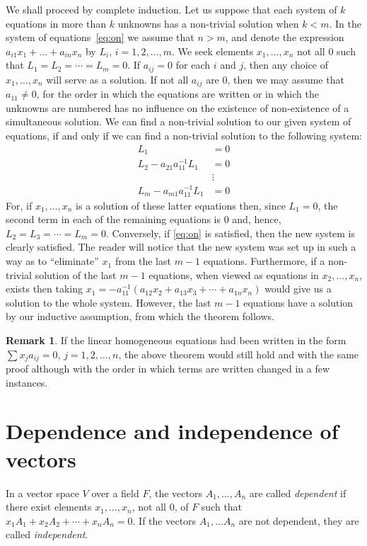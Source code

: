 \documentclass[10pt,leqno,a5paper]{book}
\theoremstyle{definition}
\newtheorem*{rema}{Remark}
\let\htw\section
\begin{document}
We shall proceed by complete induction.
Let us suppose that each system of $k$ equations in more than $k$ unknowns has a non-trivial solution when $k < m$.
In the system of equations~\eqref{eq:on} we assume that $n > m$, and denote the expression $a_{i1} x_1 + \ldots + a_{in} x_n$ by $L_i$, $i = 1,2,\ldots,m$.
We seek elements $x_1, \ldots, x_n$ not all $0$ such that $L_1 = L_2 = \cdots = L_m = 0$.
If $a_{ij} = 0$ for each $i$ and $j$, then any choice of $x_1, \ldots, x_n$ will serve as a solution.
If not all $a_{ij}$ are 0, then we may assume that $a_{11} \not= 0$, for the order in which the equations are written or in which the unknowns are numbered has no influence on the existence of non-existence of a simultaneous solution.
We can find a non-trivial solution to our given system of equations, if and only if we can find a non-trivial solution to the following system:
\begin{align*}
L_1 &= 0
\\
L_2 - a_{21} a_{11}^{-1} L_1 &= 0
\\
&\vdots
\\
L_m - a_{m1} a_{11}^{-1} L_1 &= 0
\end{align*}
For, if $x_1, \ldots, x_n$ is a solution of these latter equations then, since $L_1 = 0$, the second term in each of the remaining equations is 0 and, hence, $L_2 = L_3 = \cdots = L_m = 0$.
Conversely, if \eqref{eq:on} is satisfied, then the new system is clearly satisfied.
The reader will notice that the new system was set up in such a way as to ``eliminate'' $x_1$ from the last $m-1$ equations.
Furthermore, if a non-trivial solution of the last $m-1$ equations, when viewed as equations in $x_2, \ldots, x_n$, exists then taking $x_1 = -a_{11}^{-1}(a_{12} x_2 + a_{13} x_3 + \cdots + a_{1n} x_n)$ would give us a solution to the whole system.
However, the last $m-1$ equations have a solution by our inductive assumption, from which the theorem follows.


\begin{rema}
If the linear homogeneous equations had been written in the form $\sum x_j a_{ij} = 0$, $j = 1, 2, \ldots, n$, the above theorem would still hold and with the same proof although with the order in which terms are written changed in a few instances.
\end{rema}



\htw[Dependence and independence]{Dependence and independence of vectors}

In a vector space $V$ over a field $F$, the vectors $A_1, \ldots, A_n$ are called \emph{dependent} if there exist elements $x_1, \ldots, x_n$, not all $0$, of $F$ such that $x_1 A_1 + x_2 A_2 + \cdots + x_n A_n = 0$.
If the vectors $A_1, \ldots A_n$ are not dependent, they are called \emph{independent}.
\end{document}

